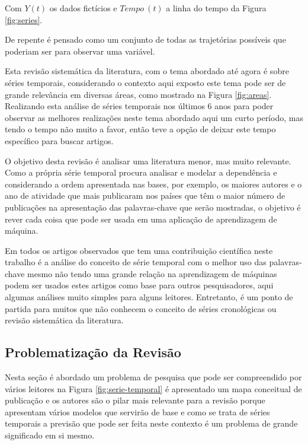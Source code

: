 

Com $Y(t)$ os dados fictícios e $Tempo \ (t)$ a linha do tempo da Figura \ref{fig:series}.

De repente é pensado como um conjunto de todas as trajetórias possíveis que poderiam ser para observar uma variável.


Esta revisão sistemática da literatura, com o tema abordado até agora é sobre séries temporais, considerando o contexto aqui exposto este tema pode ser de grande relevância em diversas áreas, como mostrado na Figura \ref{fig:areas}. Realizando esta análise de séries temporais nos últimos 6 anos para poder observar as melhores realizações neste tema abordado aqui um curto período, mas tendo o tempo não muito a favor, então teve a opção de deixar este tempo específico para buscar artigos.

O objetivo desta revisão é analisar uma literatura menor, mas muito relevante. Como a própria série temporal procura analisar e modelar a dependência e considerando a ordem apresentada nas bases, por exemplo, os maiores autores e o ano de atividade que mais publicaram nos países que têm o maior número de publicações na apresentação das palavras-chave que serão mostradas, o objetivo é rever cada coisa que pode ser usada em uma aplicação de aprendizagem de máquina.

Em todos os artigos observados que tem uma contribuição científica neste trabalho é a análise do conceito de série temporal com o melhor uso das palavras-chave mesmo não tendo uma grande relação na aprendizagem de máquinas podem ser usados estes artigos como base para outros pesquisadores, aqui algumas análises muito simples para alguns leitores. Entretanto, é um ponto de partida para muitos que não conhecem o conceito de séries cronológicas ou revisão sistemática da literatura.


\subsection{Problematiza\c c\~ao da Revis\~ao} \label{subsec: problematização da revisão}

Nesta seção é abordado um problema de pesquisa que pode ser compreendido por vários leitores na Figura \ref{fig:serie-temporal} é apresentado um mapa conceitual de publicação e os autores são o pilar mais relevante para a revisão porque apresentam vários modelos que servirão de base e como se trata de séries temporais a previsão que pode ser feita neste contexto é um problema de grande significado em si mesmo.

